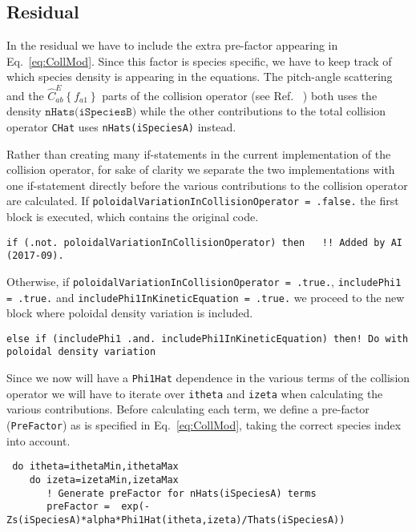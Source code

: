 \documentclass[12pt]{article}
\begin{document}
\subsection*{Residual}
\label{sec:Res}
In the residual we have to include the extra pre-factor appearing in Eq.~\eqref{eq:CollMod}. Since this factor is species specific, we have to keep track of which species density is appearing in the equations. The pitch-angle scattering and the $\hat C^E_{ab}\left \{f_{a1}\right \}$ parts of the collision operator (see Ref. ~\cite{ref:Coll1}) both uses the density $\texttt{nHats(iSpeciesB)}$ while the other contributions to the total collision operator \texttt{CHat} uses \texttt{nHats(iSpeciesA)} instead. 

Rather than creating many if-statements in the current implementation of the collision operator, for sake of clarity we separate the two implementations with one if-statement directly before the various contributions to the collision operator are calculated. If \texttt{poloidalVariationInCollisionOperator = .false.} the first block is executed, which contains the original code. 

\begin{lstlisting}
if (.not. poloidalVariationInCollisionOperator) then   !! Added by AI (2017-09).
\end{lstlisting}

\noindent Otherwise, if \texttt{poloidalVariationInCollisionOperator = .true.}, \texttt{includePhi1 = .true.} and \texttt{includePhi1InKineticEquation = .true.} we proceed to the new block where poloidal density variation is included.

\begin{lstlisting}
else if (includePhi1 .and. includePhi1InKineticEquation) then! Do with poloidal density variation
\end{lstlisting}

\noindent
Since we now will have a \texttt{Phi1Hat} dependence in the various terms of the collision operator we will have to iterate over \texttt{itheta} and \texttt{izeta} when calculating the various contributions. Before calculating each term, we define a pre-factor (\texttt{PreFactor}) as is specified in Eq.~\eqref{eq:CollMod}, taking the correct species index into account. 

\begin{lstlisting}
 do itheta=ithetaMin,ithetaMax
    do izeta=izetaMin,izetaMax
       ! Generate preFactor for nHats(iSpeciesA) terms
       preFactor =  exp(-Zs(iSpeciesA)*alpha*Phi1Hat(itheta,izeta)/Thats(iSpeciesA))
\end{lstlisting}
\end{document}
